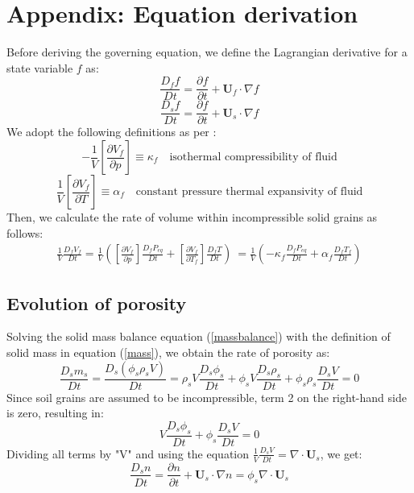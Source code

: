 \documentclass[preprint,12pt]{elsarticle}
\begin{document}
\section{\textsf{Appendix: Equation derivation}}
%
%
Before deriving the governing equation, we define the Lagrangian derivative for a state variable $f$ as:
\begin{equation}
\frac{D_f f}{Dt} = \frac{\partial f}{\partial t} + \pmb{U}_f \cdot \nabla f
\end{equation}
\begin{equation}
\frac{D_s f}{Dt} = \frac{\partial f}{\partial t} + \pmb{U}_s \cdot \nabla f
\end{equation}
We adopt the following definitions as per \cite{Kashiwa}:
\begin{equation}
-\frac{1}{V} \left[ \frac{\partial V_f}{\partial p} \right] \equiv \kappa_f \quad \text{isothermal compressibility of fluid}
\end{equation}
\begin{equation}
\frac{1}{V} \left[ \frac{\partial V_f}{\partial T} \right] \equiv \alpha_f \quad \text{constant pressure thermal expansivity of fluid}
\end{equation}
Then, we calculate the rate of volume within incompressible solid grains as follows:
\begin{equation}
\label{fluidvolumerate}
\begin{gathered}
\frac{1}{V} \frac{D_f V_f}{Dt} = \frac{1}{V} \left( \left[ \frac{\partial V_f}{\partial p} \right] \frac{D_f P_{eq}}{Dt} + \left[ \frac{\partial V_f}{\partial T_f} \right] \frac{D_f T}{Dt} \right) \
= \frac{1}{V} \left( -\kappa_f \frac{D_f P_{eq}}{Dt} + \alpha_f \frac{D_f T_f}{Dt} \right)
\end{gathered}
\end{equation}

\subsection{\textsf{Evolution of porosity}}
%
%
Solving the solid mass balance equation (\ref{massbalance}) with the definition of solid mass in equation (\ref{mass}), we obtain the rate of porosity as:
\begin{equation}
\frac{D_s m_s}{Dt} = \frac{D_s(\phi_s \rho_s V)}{Dt} = \rho_s V \frac{D_s \phi_s}{Dt} + \phi_s V \frac{D_s \rho_s}{Dt} + \phi_s \rho_s \frac{D_s V}{Dt} = 0
\end{equation}
Since soil grains are assumed to be incompressible, term 2 on the right-hand side is zero, resulting in:
\begin{equation}
V \frac{D_s \phi_s}{Dt} + \phi_s \frac{D_s V}{Dt} = 0
\end{equation}
Dividing all terms by "V" and using the equation $\frac{1}{V} \frac{D_s V}{Dt} = \nabla \cdot \pmb{U}_s $, we get:
\begin{equation}
\frac{D_s n}{Dt} = \frac{\partial n}{\partial t} + \pmb{U}_s \cdot \nabla n = \phi_s \nabla \cdot \pmb{U}_s
\end{equation}
\end{document}
